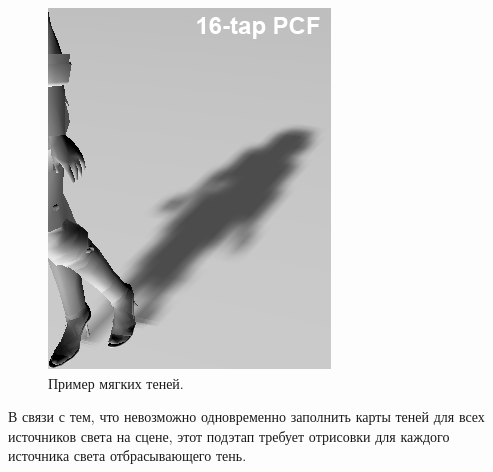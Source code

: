 		 \begin{figure}[ht!] 
		 	\center
		 	\includegraphics [scale=1] {my_folder/images//pcf_shadows}	
		 	\caption{Пример мягких теней.} 
		 	\label{fig:pcf_shadows}
		 \end{figure}
		 
		 В связи с тем, что невозможно одновременно заполнить карты теней для всех источников света на сцене, этот подэтап требует отрисовки для каждого источника света отбрасывающего тень.